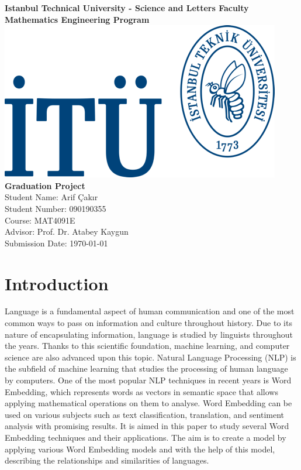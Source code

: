 \documentclass[man]{apa7}
\begin{document}
\begin{titlepage}
\centering
{\large \textbf{ Istanbul Technical University - Science and Letters Faculty}}\\
{\large \textbf{Mathematics Engineering Program}}\\[4\baselineskip]
\includegraphics[scale = 1.5]{itülogo.png}\\[6\baselineskip]
{\LARGE \textbf{Graduation Project}}\\[2\baselineskip]

{\Large Student Name: Arif Çakır}\\
{\large Student Number: 090190355}\\
{\large Course: MAT4091E}\\
{\large Advisor: Prof. Dr. Atabey Kaygun}\\
{\large Submission Date: \today}\\
\end{titlepage}
\tableofcontents
\pagebreak

\section{Introduction}
Language is a fundamental aspect of human communication and one of the most common ways to pass on information and culture throughout history. Due to its nature of encapsulating information, language is studied by linguists throughout the years. Thanks to this scientific foundation, machine learning, and computer science are also advanced upon this topic. Natural Language Processing (NLP) is the subfield of machine learning that studies the processing of human language by computers. One of the most popular NLP techniques in recent years is Word Embedding, which represents words as vectors in semantic space that allows applying mathematical operations on them to analyse. Word Embedding can be used on various subjects such as text classification, translation, and sentiment analysis with promising results. It is aimed in this paper to study several Word Embedding techniques and their applications. The aim is to create a model by applying various Word Embedding models and with the help of this model, describing the relationships and similarities of languages.
\end{document}

